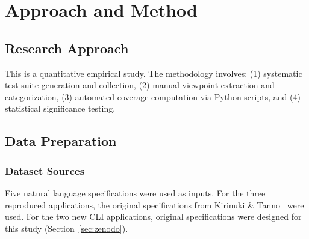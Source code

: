 \documentclass[12pt,a4paper]{article}
\begin{document}
\section{Approach and Method}

\subsection{Research Approach}
This is a quantitative empirical study. The methodology involves: (1) systematic test-suite generation and collection, (2) manual viewpoint extraction and categorization, (3) automated coverage computation via Python scripts, and (4) statistical significance testing.

\subsection{Data Preparation}

\subsubsection*{Dataset Sources}
Five natural language specifications were used as inputs. For the three reproduced applications, the original specifications from Kirinuki \& Tanno~\cite{b1} were used. For the two new CLI applications, original specifications were designed for this study (Section~\ref{sec:zenodo}).
\end{document}
